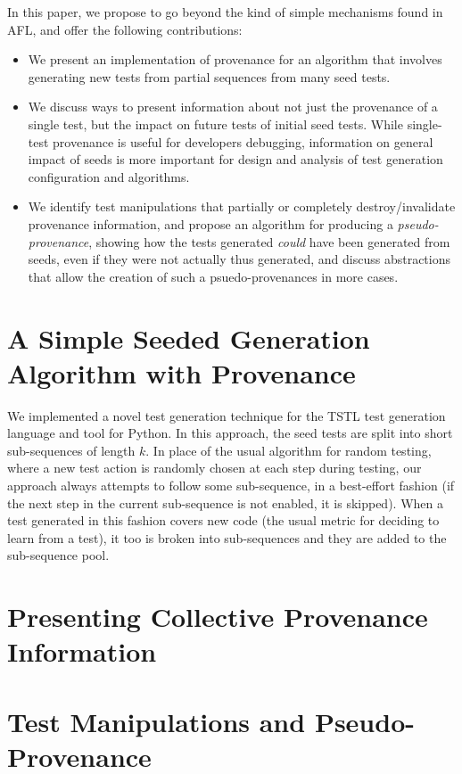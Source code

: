\documentclass[final]{article}
\begin{document}
In this paper, we propose to go beyond the kind of simple mechanisms
found in AFL, and
offer the following contributions:

\begin{itemize}
\item We present an implementation of provenance for an algorithm that involves
  generating new tests from partial sequences from many seed tests.
\item We discuss ways to present information about not just the
  provenance of a single test, but the impact on future tests of
  initial seed tests.  While single-test provenance is useful for
  developers debugging, information on general impact of seeds is more
  important for design and analysis of test generation configuration
  and algorithms.
\item We identify test manipulations that partially or completely
  destroy/invalidate provenance information, and propose an algorithm
  for producing a \emph{pseudo-provenance}, showing how the tests generated
  \emph{could} have been generated from seeds, even if they were not actually
  thus generated, and discuss abstractions that allow the
  creation of such a psuedo-provenances in more cases.
\end{itemize}

\section{A Simple Seeded Generation Algorithm with Provenance}

We implemented a novel test generation technique for the TSTL
\cite{tstlsttt,nfm15,issta15} test generation language and tool for
Python.  In this approach, the seed tests are split into short
sub-sequences of length $k$.  In place of the usual algorithm for
random testing, where a new test action is randomly chosen at each
step during testing, our approach always attempts to follow some
sub-sequence, in a best-effort fashion (if the next step in the
current sub-sequence is not enabled, it is skipped).  When a test
generated in this fashion covers new code (the usual metric for
deciding to learn from a test), it too is broken into sub-sequences
and they are added to the sub-sequence pool.

\section{Presenting Collective Provenance Information}

\section{Test Manipulations and Pseudo-Provenance}
\end{document}
